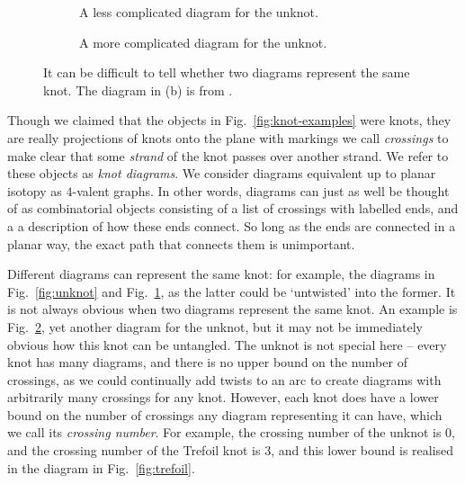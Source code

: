\documentclass[12pt]{report}
\theoremstyle{upright}
\begin{document}
\begin{figure}[hbt]
	\centering
	\hspace*{\fill}
	\begin{subfigure}[b]{0.35 \textwidth}
		\centering
		\def\svgscale{0.2}
		
		\caption{A less complicated diagram for the unknot.}
		\label{fig:unknot-twisted}
	\end{subfigure}
	\hspace*{\fill}
	\begin{subfigure}[b]{0.35 \textwidth}
		\centering
		\def\svgscale{0.2}
		
		\caption{A more complicated diagram for the unknot.}
		\label{fig:unknot-goertiz}
	\end{subfigure}
	\hspace*{\fill}
	\caption{It can be difficult to tell whether two diagrams represent the same knot. The diagram in (b) is from \cite{notes-on-knot-theory}.}
	\label{fig:more-unknots}
\end{figure}

Though we claimed that the objects in Fig.~\ref{fig:knot-examples} were knots, they are really projections of knots onto the plane with markings we call \textit{crossings} to make clear that some \textit{strand} of the knot passes over another strand. We refer to these objects as \textit{knot diagrams}. We consider diagrams equivalent up to planar isotopy as $4$-valent graphs. In other words, diagrams can just as well be thought of as combinatorial objects consisting of a list of crossings with labelled ends, and a a description of how these ends connect. So long as the ends are connected in a planar way, the exact path that connects them is unimportant.

Different diagrams can represent the same knot: for example, the diagrams in Fig.~\ref{fig:unknot} and Fig.~\ref{fig:unknot-twisted}, as the latter could be `untwisted' into the former. It is not always obvious when two diagrams represent the same knot. An example is Fig.~\ref{fig:unknot-goertiz}, yet another diagram for the unknot, but it may not be immediately obvious how this knot can be untangled. The unknot is not special here -- every knot has many diagrams, and there is no upper bound on the number of crossings, as we could continually add twists to an arc to create diagrams with arbitrarily many crossings for any knot. However, each knot does have a lower bound on the number of crossings any diagram representing it can have, which we call its \textit{crossing number}. For example, the crossing number of the unknot is $0$, and the crossing number of the Trefoil knot is $3$, and this lower bound is realised in the diagram in Fig.~\ref{fig:trefoil}.
\end{document}
